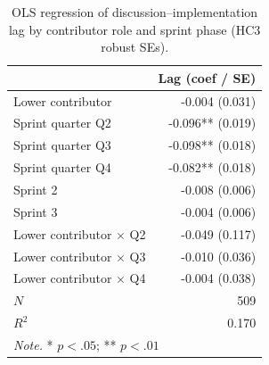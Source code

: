 \begin{table}[ht]
\centering
\scriptsize
\setlength{\tabcolsep}{4pt}
\renewcommand{\arraystretch}{0.88}
\caption{OLS regression of discussion--implementation lag by contributor role and sprint phase (HC3 robust SEs).}
\label{tab:lag_model}
\begin{tabular}{l r}
\toprule
 & \textbf{Lag (coef / SE)} \\
\midrule
Lower contributor & -0.004 (0.031) \\
Sprint quarter Q2 & -0.096** (0.019) \\
Sprint quarter Q3 & -0.098** (0.018) \\
Sprint quarter Q4 & -0.082** (0.018) \\
Sprint 2 & -0.008 (0.006) \\
Sprint 3 & -0.004 (0.006) \\
Lower contributor $\times$ Q2 & -0.049 (0.117) \\
Lower contributor $\times$ Q3 & -0.010 (0.036) \\
Lower contributor $\times$ Q4 & -0.004 (0.038) \\
\midrule
$N$ & 509 \\
$R^2$ & 0.170 \\
\midrule
\multicolumn{2}{l}{\textit{Note.} * $p < .05$; ** $p < .01$} \\
\bottomrule
\end{tabular}
\end{table}
